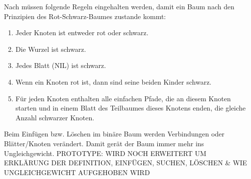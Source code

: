 
Nach \cite[S.311]{tcormen} müssen folgende Regeln eingehalten werden, damit ein Baum nach den Prinzipien des Rot-Schwarz-Baumes zustande kommt:

\begin{enumerate}
	\item Jeder Knoten ist entweder rot oder schwarz.
	\item Die Wurzel ist schwarz.
	\item Jedes Blatt (NIL) ist schwarz.
	\item Wenn ein Knoten rot ist, dann sind seine beiden Kinder schwarz.
	\item Für jeden Knoten enthalten alle einfachen Pfade, die an diesem Knoten starten und in einem Blatt des Teilbaumes dieses Knotens enden, die gleiche Anzahl schwarzer Knoten. 
\end{enumerate}


Beim Einfügen bzw. Löschen im binäre Baum werden Verbindungen oder Blätter/Knoten verändert. Damit gerät der Baum immer mehr ins Ungleichgewicht. 
\newline
\newline
PROTOTYPE: \newline
WIRD NOCH ERWEITERT UM ERKLÄRUNG DER DEFINITION, EINFÜGEN, SUCHEN, LÖSCHEN \& WIE UNGLEICHGEWICHT AUFGEHOBEN WIRD
\newline
